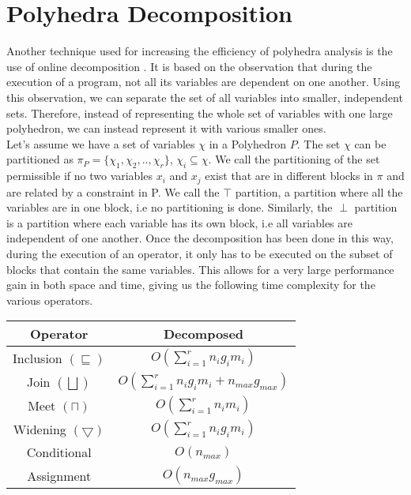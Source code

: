  \section{Polyhedra Decomposition}
Another technique used for increasing the efficiency of polyhedra analysis is the use of online decomposition \cite{singh2017fast}. It is based on the observation that during the execution of a program, not all its variables are dependent on one another. Using this observation, we can separate the set of all variables into smaller, independent sets. Therefore, instead of representing the whole set of variables with one large polyhedron, we can instead represent it with various smaller ones.\\ Let's assume we have a set of variables $\chi$ in a Polyhedron $P$. The set $\chi$ can be partitioned as $\pi_P=\{ \chi_1,\chi_2,..,\chi_r\}$, $\chi_i\subseteq\chi $. We call the partitioning of the set permissible if no two variables $x_i$ and $x_j$ exist that are in different blocks in $\pi$ and are related by a constraint in P. We call the $\top$ partition, a partition where all the variables are in one block, i.e no partitioning is done. Similarly, the $\perp$ partition is a partition where each variable has its own block, i.e all variables are independent of one another. Once the decomposition has been done in this way, during the execution of an operator, it only has to be executed on the subset of blocks that contain the same variables. This allows for a very large performance gain in both space and time, giving us the following time complexity for the various operators.

\begin{center}
\begin{tabular}{||c c||} 
 
 \hline
 Operator & Decomposed  \\ [0.5ex] 
 \hline
 Inclusion $(\sqsubseteq)$ & $O(\sum_{i=1}^r n_ig_im_i)$\\ 
 \hline
 Join $(\bigsqcup)$ & $O(\sum_{i=1}^r n_i g_i m_i + n_{max} g_{max})$ \\
 \hline
 Meet $(\sqcap)$ & $O(\sum_{i=1}^r n_i m_i)$ \\
 \hline
 Widening $(\bigtriangledown)$ & $O(\sum_{i=1}^r n_i g_i m_i)$\\
 \hline
 Conditional & $O(n_{max})$ \\ 
 \hline
 Assignment & $O(n_{max}g_{max})$ \\ 
 
 
 \hline
\end{tabular}
\end{center}

